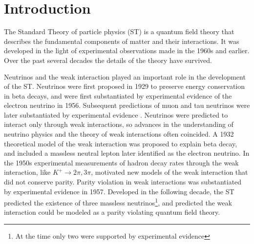 \chapter{Introduction}
\label{intro_chapter}

The Standard Theory of particle physics (ST) \cite{weinbergSM,salamSM} 
is a quantum field theory that describes the fundamental components of matter and their interactions.  It 
was developed in the light of experimental observations made in the 1960s and earlier.  Over the past 
several decades the details of the theory have survived.


Neutrinos and the weak interaction played an important role in the development of the ST.  
Neutrinos were first proposed in 1929 to preserve energy conservation in beta decays, and were first 
substantiated by experimental evidence \cite{firstNuDiscovery} of the electron neutrino in 1956.  
Subsequent predictions of muon and tau neutrinos were later substantiated 
by experimental evidence \cite{muNuDiscovery,tauNuDiscovery}.  Neutrinos were predicted to interact only through weak 
interactions, so advances in the understanding of neutrino physics and the theory of weak interactions often coincided.  
A 1932 theoretical model of the weak interaction was proposed to explain beta decay, and included a massless 
neutral lepton later identified as the electron neutrino.  In the 1950s experimental measurements of 
hadron decay rates through the weak interaction, like $K^{+} \rightarrow 2\pi, 3\pi$, motivated new 
models of the weak interaction that did not conserve parity.  Parity violation in weak interactions was 
substantiated by experimental evidence \cite{weakParityViolation} in 1957.  Developed in the following decade, the 
ST predicted the existence of three massless neutrinos\footnote{At the time only two were supported 
by experimental evidence}, and predicted the weak interaction could be modeled as a parity violating 
quantum field theory.

